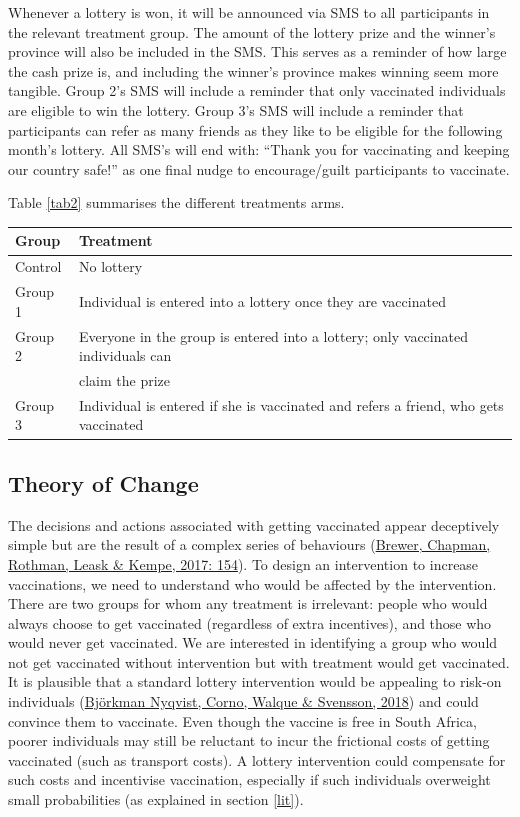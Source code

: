 \documentclass[11pt,preprint, authoryear]{elsarticle}
\let\origtable\table
\let\endorigtable\endtable
\renewenvironment{table}[1][2] {
    \expandafter\origtable\expandafter[H]
} {
    \endorigtable
}
\numberwithin{equation}{section}
\numberwithin{figure}{section}
\numberwithin{table}{section}
\begin{document}
Whenever a lottery is won, it will be announced via SMS to all
participants in the relevant treatment group. The amount of the lottery
prize and the winner's province will also be included in the SMS. This
serves as a reminder of how large the cash prize is, and including the
winner's province makes winning seem more tangible. Group 2's SMS will
include a reminder that only vaccinated individuals are eligible to win
the lottery. Group 3's SMS will include a reminder that participants can
refer as many friends as they like to be eligible for the following
month's lottery. All SMS's will end with: ``Thank you for vaccinating
and keeping our country safe!'' as one final nudge to encourage/guilt
participants to vaccinate.

Table \ref{tab2} summarises the different treatments arms.

\begin{table}[H]
\centering
\begin{tabular}{ll}
  \toprule
Group & Treatment \\ 
  \midrule
Control & No lottery \\ 
  Group 1 & Individual is entered into a lottery once they are vaccinated \\ 
  Group 2 & Everyone in the group is entered into a lottery; only vaccinated individuals can \\ 
   & claim the prize \\ 
  Group 3 & Individual is entered if she is vaccinated and refers a friend, who gets vaccinated \\ 
   \bottomrule
\end{tabular}
\caption{Treatment Summary \label{tab2}} 
\end{table}

\hypertarget{theory-of-change}{%
\subsection{Theory of Change}\label{theory-of-change}}

The decisions and actions associated with getting vaccinated appear
deceptively simple but are the result of a complex series of behaviours
(\protect\hyperlink{ref-decide}{Brewer, Chapman, Rothman, Leask \&
Kempe, 2017: 154}). To design an intervention to increase vaccinations,
we need to understand who would be affected by the intervention. There
are two groups for whom any treatment is irrelevant: people who would
always choose to get vaccinated (regardless of extra incentives), and
those who would never get vaccinated. We are interested in identifying a
group who would not get vaccinated without intervention but with
treatment would get vaccinated. It is plausible that a standard lottery
intervention would be appealing to risk-on individuals
(\protect\hyperlink{ref-hiv}{Björkman Nyqvist, Corno, Walque \&
Svensson, 2018}) and could convince them to vaccinate. Even though the
vaccine is free in South Africa, poorer individuals may still be
reluctant to incur the frictional costs of getting vaccinated (such as
transport costs). A lottery intervention could compensate for such costs
and incentivise vaccination, especially if such individuals overweight
small probabilities (as explained in section \ref{lit}).
\end{document}
